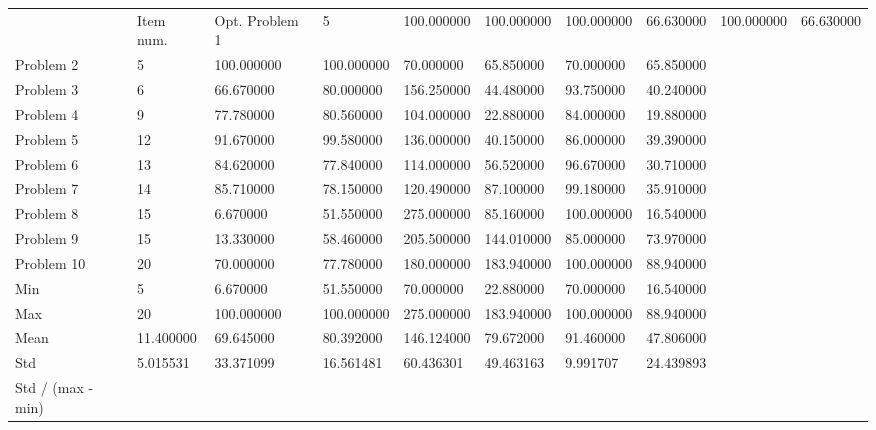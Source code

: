 \begin{tabular}{llllllll}
\toprule
 & Item num. & Opt. %
\midrule
Problem 1 & 5 & 100.000000 & 100.000000 & 100.000000 & 66.630000 & 100.000000 & 66.630000 \\
Problem 2 & 5 & 100.000000 & 100.000000 & 70.000000 & 65.850000 & 70.000000 & 65.850000 \\
Problem 3 & 6 & 66.670000 & 80.000000 & 156.250000 & 44.480000 & 93.750000 & 40.240000 \\
Problem 4 & 9 & 77.780000 & 80.560000 & 104.000000 & 22.880000 & 84.000000 & 19.880000 \\
Problem 5 & 12 & 91.670000 & 99.580000 & 136.000000 & 40.150000 & 86.000000 & 39.390000 \\
Problem 6 & 13 & 84.620000 & 77.840000 & 114.000000 & 56.520000 & 96.670000 & 30.710000 \\
Problem 7 & 14 & 85.710000 & 78.150000 & 120.490000 & 87.100000 & 99.180000 & 35.910000 \\
Problem 8 & 15 & 6.670000 & 51.550000 & 275.000000 & 85.160000 & 100.000000 & 16.540000 \\
Problem 9 & 15 & 13.330000 & 58.460000 & 205.500000 & 144.010000 & 85.000000 & 73.970000 \\
Problem 10 & 20 & 70.000000 & 77.780000 & 180.000000 & 183.940000 & 100.000000 & 88.940000 \\
Min & 5 & 6.670000 & 51.550000 & 70.000000 & 22.880000 & 70.000000 & 16.540000 \\
Max & 20 & 100.000000 & 100.000000 & 275.000000 & 183.940000 & 100.000000 & 88.940000 \\
Mean & 11.400000 & 69.645000 & 80.392000 & 146.124000 & 79.672000 & 91.460000 & 47.806000 \\
Std & 5.015531 & 33.371099 & 16.561481 & 60.436301 & 49.463163 & 9.991707 & 24.439893 \\
Std / (max - min) %
\bottomrule
\end{tabular}
